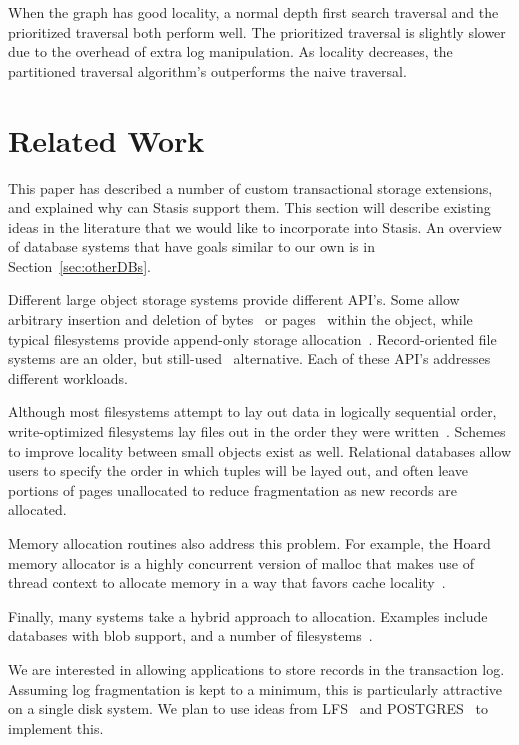 \documentclass[letterpaper,twocolumn,10pt]{article}
\newcommand{\yad}{Stasis\xspace}
\newcommand{\rcs}[1]{\textcolor{green}{\bf RCS: #1}}
\begin{document}
When the graph has good locality, a normal depth first search
traversal and the prioritized traversal both perform well.  The
prioritized traversal is slightly slower due to the overhead of extra
log manipulation. As locality decreases, the partitioned traversal
algorithm's outperforms the naive traversal.


\section{Related Work}

This paper has described a number of custom transactional storage
extensions, and explained why can \yad support them.  This section
will describe existing ideas in the literature that we would like to
incorporate into \yad.  An overview of database systems that have 
goals similar to our own is in Section~\ref{sec:otherDBs}.

Different large object storage systems provide different API's.
Some allow arbitrary insertion and deletion of bytes~\cite{esm} or
pages~\cite{sqlserver} within the object, while typical filesystems
provide append-only storage allocation~\cite{ffs}.
Record-oriented file systems are an older, but still-used~\cite{gfs}
alternative. Each of these API's addresses 
different workloads.

Although most filesystems attempt to lay out data in logically sequential
order, write-optimized filesystems lay files out in the order they
were written~\cite{lfs}.  Schemes to improve locality between small
objects exist as well. Relational databases allow users to specify the order
in which tuples will be layed out, and often leave portions of pages
unallocated to reduce fragmentation as new records are allocated.

Memory allocation routines also address this problem.  For example, the Hoard memory
allocator is a highly concurrent version of malloc that
makes use of thread context to allocate memory in a way that favors
cache locality~\cite{hoard}.  %

Finally, many systems take a hybrid approach to allocation.  Examples include
databases with blob support, and a number of
filesystems~\cite{reiserfs,ffs}.

We are interested in allowing applications to store records in
the transaction log.  Assuming log fragmentation is kept to a
minimum, this is particularly attractive on a single disk system.  We
plan to use ideas from LFS~\cite{lfs} and POSTGRES~\cite{postgres}
to implement this.
\end{document}
